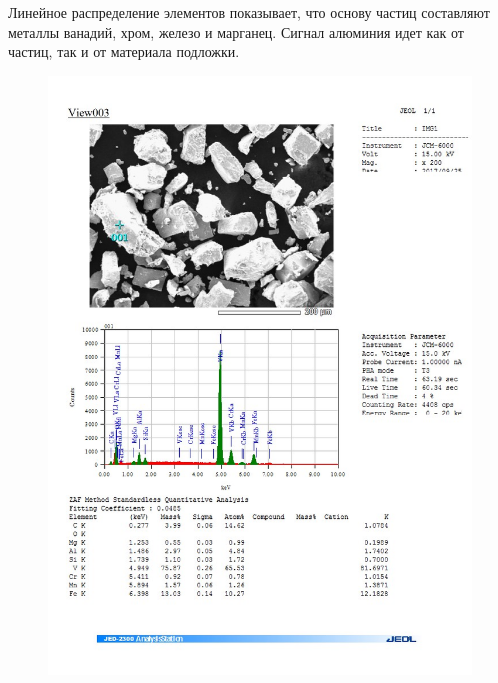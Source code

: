 \documentclass[14pt]{extarticle}
\begin{document}
Линейное распределение элементов показывает, что основу частиц составляют металлы ванадий, хром, железо и марганец. Сигнал алюминия идет как от частиц, так и от материала подложки.

\begin{figure}[H]
	\includegraphics[width = \linewidth]{./pictures/dot_spec_1.jpg}
\end{figure}
\end{document}
